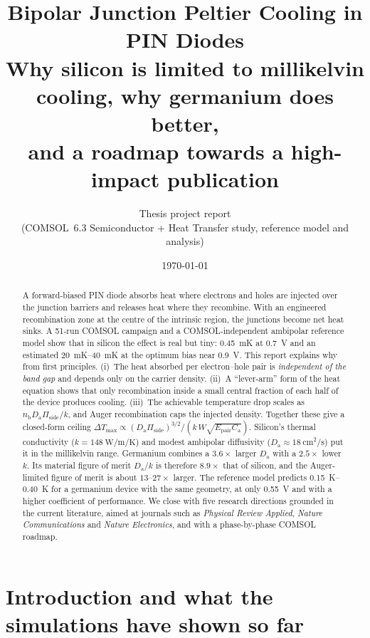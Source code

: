 \documentclass[11pt,a4paper]{article}
\title{\textbf{Bipolar Junction Peltier Cooling in PIN Diodes}\\[4pt]
\large Why silicon is limited to millikelvin cooling, why germanium does better,\\
and a roadmap towards a high-impact publication}
\author{Thesis project report\\ \small (COMSOL~6.3 Semiconductor + Heat Transfer study, reference model and analysis)}
\date{\today}
\newcommand{\Ep}{E_{\mathrm{pair}}}
\newcommand{\Da}{D_{\mathrm{a}}}
\newcommand{\Ca}{C_{\mathrm{a}}}
\newcommand{\nb}{n_{\mathrm{b}}}
\newcommand{\Pis}{\Pi_{\mathrm{side}}}
\begin{document}
\maketitle

\begin{abstract}
\noindent A forward-biased PIN diode absorbs heat where electrons and holes are injected over the junction barriers and releases heat where they recombine. With an engineered recombination zone at the centre of the intrinsic region, the junctions become net heat sinks. A 51-run COMSOL campaign and a COMSOL-independent ambipolar reference model show that in silicon the effect is real but tiny: \SI{0.45}{\milli\kelvin} at \SI{0.7}{\volt} and an estimated \SIrange{20}{40}{\milli\kelvin} at the optimum bias near \SI{0.9}{\volt}. This report explains why from first principles. (i)~The heat absorbed per electron--hole pair is \emph{independent of the band gap} and depends only on the carrier density. (ii)~A ``lever-arm'' form of the heat equation shows that only recombination inside a small central fraction of each half of the device produces cooling. (iii)~The achievable temperature drop scales as $\nb\Da\Pis/k$, and Auger recombination caps the injected density. Together these give a closed-form ceiling $\Delta T_{\max}\propto(\Da\Pis)^{3/2}/(k\,W\sqrt{\Ep\Ca})$. Silicon's thermal conductivity ($k=\SI{148}{\watt\per\metre\per\kelvin}$) and modest ambipolar diffusivity ($\Da\approx\SI{18}{\centi\metre\squared\per\second}$) put it in the millikelvin range. Germanium combines a $3.6\times$ larger $\Da$ with a $2.5\times$ lower $k$. Its material figure of merit $\Da/k$ is therefore $8.9\times$ that of silicon, and the Auger-limited figure of merit is about $13$--$27\times$ larger. The reference model predicts \SIrange{0.15}{0.40}{\kelvin} for a germanium device with the same geometry, at only \SI{0.55}{\volt} and with a higher coefficient of performance. We close with five research directions grounded in the current literature, aimed at journals such as \emph{Physical Review Applied}, \emph{Nature Communications} and \emph{Nature Electronics}, and with a phase-by-phase COMSOL roadmap.
\end{abstract}

\tableofcontents
\newpage

\section{Introduction and what the simulations have shown so far}
\end{document}
